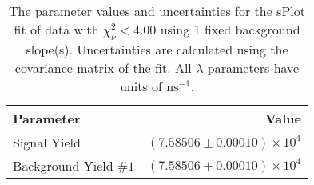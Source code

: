 
\begin{table}
    \begin{center}
        \begin{tabular}{lr}\toprule
            Parameter & Value \\\midrule
            Signal Yield & $(7.58506 \pm 0.00010) \times 10^{4}$ \\
            Background Yield $\#1$ & $(7.58506 \pm 0.00010) \times 10^{4}$ \\\bottomrule
        \end{tabular}
        \caption{The parameter values and uncertainties for the sPlot fit of data with $\chi^2_\nu < 4.00$ using 1 fixed background slope(s). Uncertainties are calculated using the covariance matrix of the fit. All $\lambda$ parameters have units of $\si{\nano\second}^{-1}$.}
    \end{center}
\end{table}
